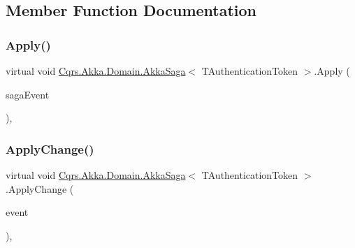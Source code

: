 \subsection{Member Function Documentation}
\mbox{\label{classCqrs_1_1Akka_1_1Domain_1_1AkkaSaga_a4a12310825f2d2cc5963eee4cc4ed802_a4a12310825f2d2cc5963eee4cc4ed802}} 
\subsubsection{\texorpdfstring{Apply()}{Apply()}}
{\footnotesize\ttfamily virtual void \hyperlink{classCqrs_1_1Akka_1_1Domain_1_1AkkaSaga}{Cqrs.\+Akka.\+Domain.\+Akka\+Saga}$<$ T\+Authentication\+Token $>$.Apply (\begin{DoxyParamCaption}\item[{\hyperlink{interfaceCqrs_1_1Events_1_1ISagaEvent}{I\+Saga\+Event}$<$ T\+Authentication\+Token $>$}]{saga\+Event }\end{DoxyParamCaption})\hspace{0.3cm}{\ttfamily [protected]}, {\ttfamily [virtual]}}

\mbox{\label{classCqrs_1_1Akka_1_1Domain_1_1AkkaSaga_a42126a6a1a7896d16412b6023f208f7c_a42126a6a1a7896d16412b6023f208f7c}} 
\subsubsection{\texorpdfstring{Apply\+Change()}{ApplyChange()}\hspace{0.1cm}{\footnotesize\ttfamily [1/2]}}
{\footnotesize\ttfamily virtual void \hyperlink{classCqrs_1_1Akka_1_1Domain_1_1AkkaSaga}{Cqrs.\+Akka.\+Domain.\+Akka\+Saga}$<$ T\+Authentication\+Token $>$.Apply\+Change (\begin{DoxyParamCaption}\item[{\hyperlink{interfaceCqrs_1_1Events_1_1ISagaEvent}{I\+Saga\+Event}$<$ T\+Authentication\+Token $>$ @}]{event }\end{DoxyParamCaption})\hspace{0.3cm}{\ttfamily [protected]}, {\ttfamily [virtual]}}

